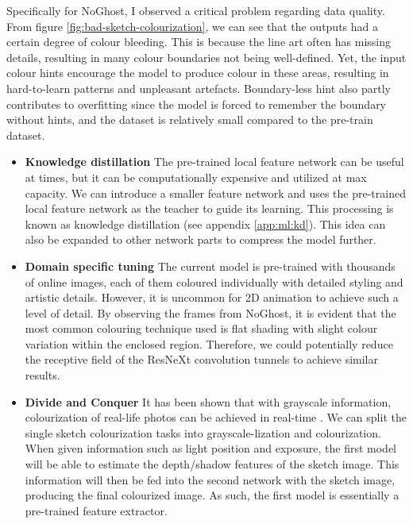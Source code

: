 Specifically for NoGhost, I observed a critical problem regarding data quality. From figure \ref{fig:bad-sketch-colourization}, we can see that the outputs had a certain degree of colour bleeding. This is because the line art often has missing details, resulting in many colour boundaries not being well-defined. Yet, the input colour hints encourage the model to produce colour in these areas, resulting in hard-to-learn patterns and unpleasant artefacts. Boundary-less hint also partly contributes to overfitting since the model is forced to remember the boundary without hints, and the dataset is relatively small compared to the pre-train dataset.

\begin{itemize}
    \item \textbf{Knowledge distillation} The pre-trained local feature network can be useful at times, but it can be computationally expensive and utilized at max capacity. We can introduce a smaller feature network and uses the pre-trained local feature network as the teacher to guide its learning. This processing is known as knowledge distillation (see appendix \ref{app:ml:kd}). This idea can also be expanded to other network parts to compress the model further.
    \item \textbf{Domain specific tuning} The current model is pre-trained with thousands of online images, each of them coloured individually with detailed styling and artistic details. However, it is uncommon for 2D animation to achieve such a level of detail. By observing the frames from NoGhost, it is evident that the most common colouring technique used is flat shading with slight colour variation within the enclosed region. Therefore, we could potentially reduce the receptive field of the ResNeXt convolution tunnels to achieve similar results.
    \item \textbf{Divide and Conquer} It has been shown that with grayscale information, colourization of real-life photos can be achieved in real-time \cite{zhangRealTimeUserGuidedImage2017}. We can split the single sketch colourization tasks into grayscale-lization and colourization. When given information such as light position and exposure, the first model will be able to estimate the depth/shadow features of the sketch image. This information will then be fed into the second network with the sketch image, producing the final colourized image. As such, the first model is essentially a pre-trained feature extractor.
\end{itemize}

